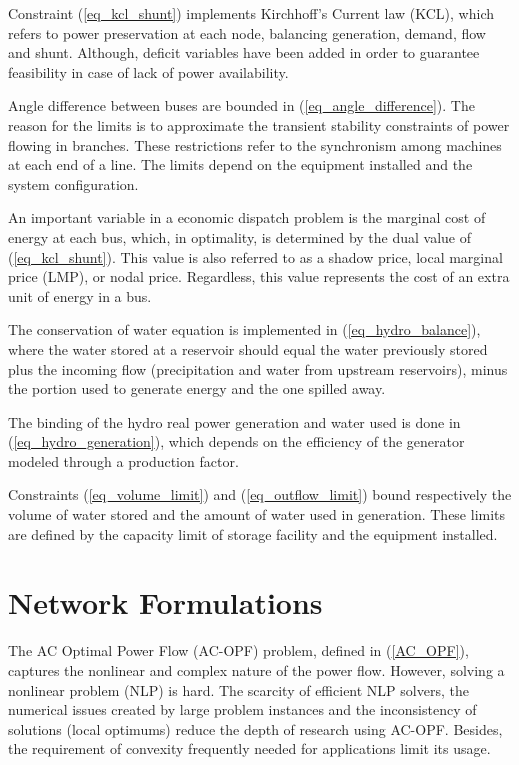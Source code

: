 \documentclass{juliacon}
\begin{document}
Constraint (\ref{eq_kcl_shunt}) implements Kirchhoff’s Current law (KCL), which refers to power preservation at each node, balancing generation, demand, flow and shunt. Although, deficit variables have been added in order to guarantee feasibility in case of lack of power availability.

Angle difference between buses are bounded in (\ref{eq_angle_difference}). The reason for the limits is to approximate the transient stability constraints of power flowing in branches. These restrictions refer to the synchronism among machines at each end of a line. The limits depend on the equipment installed and the system configuration.

An important variable in a economic dispatch problem is the marginal cost of energy at each bus, which, in optimality, is determined by the dual value of (\ref{eq_kcl_shunt}). This value is also referred to as a shadow price, local marginal price (LMP), or nodal price. Regardless, this value represents the cost of an extra unit of energy in a bus.  

The conservation of water equation is implemented in (\ref{eq_hydro_balance}), where the water stored at a reservoir should equal the water previously stored plus the incoming flow (precipitation and water from upstream reservoirs), minus the portion used to generate energy and the one spilled away.

The binding of the hydro real power generation and water used is done in (\ref{eq_hydro_generation}), which depends on the efficiency of the generator modeled through a production factor.

Constraints (\ref{eq_volume_limit}) and (\ref{eq_outflow_limit}) bound respectively the volume of water stored and the amount of water used in generation. These limits are defined by the capacity limit of storage facility and the equipment installed. 

\section{Network Formulations}
\label{sec:powermodels}

The AC Optimal Power Flow (AC-OPF) problem, defined in (\ref{AC_OPF}), captures the nonlinear and complex nature of the power flow. However, solving a nonlinear problem (NLP) is hard. The scarcity of efficient NLP solvers, the numerical issues created by large problem instances and the inconsistency of solutions (local optimums) reduce the depth of research using AC-OPF. Besides, the requirement of convexity frequently needed for applications limit its usage. 
\end{document}
